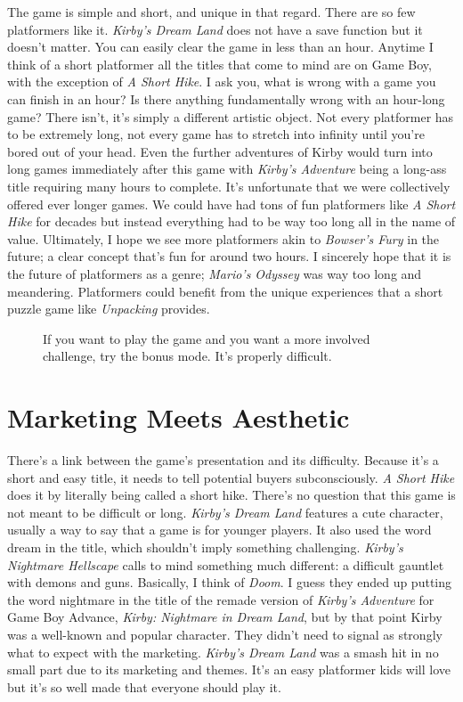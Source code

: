 \documentclass{book}
\begin{document}
The game is simple and short, and unique in that regard. There are so few platformers like it. \emph{Kirby’s Dream Land} does not have a save function but it doesn’t matter. You can easily clear the game in less than an hour. Anytime I think of a short platformer all the titles that come to mind are on Game Boy, with the exception of \emph{A Short Hike}. I ask you, what is wrong with a game you can finish in an hour? Is there anything fundamentally wrong with an hour-long game? There isn’t, it’s simply a different artistic object. Not every platformer has to be extremely long, not every game has to stretch into infinity until you’re bored out of your head. Even the further adventures of Kirby would turn into long games immediately after this game with \emph{Kirby’s Adventure} being a long-ass title requiring many hours to complete. It’s unfortunate that we were collectively offered ever longer games. We could have had tons of fun platformers like \emph{A Short Hike} for decades but instead everything had to be way too long all in the name of value. Ultimately, I hope we see more platformers akin to \emph{Bowser’s Fury} in the future; a clear concept that’s fun for around two hours. I sincerely hope that it is the future of platformers as a genre; \emph{Mario’s Odyssey} was way too long and meandering. Platformers could benefit from the unique experiences that a short puzzle game like \emph{Unpacking} provides.\par
\FloatBarrier\vspace{\baselineskip}\begin{figure}[H]\caption*{If you want to play the game and you want a more involved challenge, try the bonus mode. It’s properly difficult.}\end{figure}
\FloatBarrier\section*{Marketing Meets Aesthetic}
There’s a link between the game’s presentation and its difficulty. Because it’s a short and easy title, it needs to tell potential buyers subconsciously. \emph{A Short Hike} does it by literally being called a short hike. There’s no question that this game is not meant to be difficult or long. \emph{Kirby’s Dream Land} features a cute character, usually a way to say that a game is for younger players. It also used the word dream in the title, which shouldn’t imply something challenging. \emph{Kirby’s Nightmare Hellscape} calls to mind something much different: a difficult gauntlet with demons and guns. Basically, I think of \emph{Doom}. I guess they ended up putting the word nightmare in the title of the remade version of \emph{Kirby’s Adventure} for Game Boy Advance, \emph{Kirby: Nightmare in Dream Land}, but by that point Kirby was a well-known and popular character. They didn’t need to signal as strongly what to expect with the marketing. \emph{Kirby’s Dream Land} was a smash hit in no small part due to its marketing and themes. It’s an easy platformer kids will love but it’s so well made that everyone should play it.\par
\end{document}
